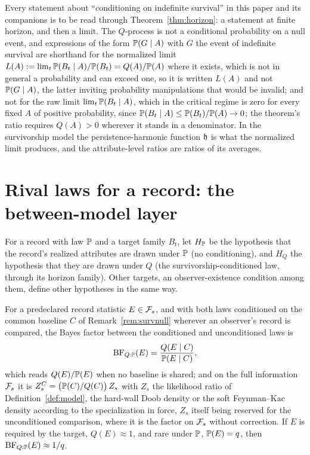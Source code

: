 \begin{remark}\label{rem:limit}
Every statement about ``conditioning on indefinite survival'' in this
paper and its companions is to be read through Theorem~\ref{thm:horizon}:
a statement at finite horizon, and then a limit. The $Q$-process is not a
conditional probability on a null event, and expressions of the form
$\mathbb{P}(G\mid A)$ with $G$ the event of indefinite survival are shorthand for the normalized limit $L(A) := \lim_t \mathbb{P}(B_t \mid A)/\mathbb{P}(B_t) = Q(A)/\mathbb{P}(A)$ where it exists, which is not in general a probability and can exceed one, so it is written $L(A)$ and not $\mathbb{P}(G \mid A)$, the latter inviting probability manipulations that would be invalid; and not for the raw limit $\lim_t \mathbb{P}(B_t \mid A)$, which in the critical regime is zero for every fixed $A$ of positive probability, since $\mathbb{P}(B_t \mid A) \le \mathbb{P}(B_t)/\mathbb{P}(A) \to 0$; the theorem's ratio requires $Q(A) > 0$ wherever it stands in a denominator. In the survivorship model the persistence-harmonic function $\mathfrak{h}$ is what the normalized limit produces, and
the attribute-level ratios are ratios of its averages.
\end{remark}

\section{Rival laws for a record: the between-model layer}
\label{sec:models}

\begin{definition}\label{def:hyps}
For a record with law $\mathbb{P}$ and a target family $B_t$, let $H_{\mathbb{P}}$ be the
hypothesis that the record's realized attributes are drawn under $\mathbb{P}$
(no conditioning), and $H_Q$ the hypothesis that they are drawn under
$Q$ (the survivorship-conditioned law, through its horizon family). Other
targets, an observer-existence condition among them, define other
hypotheses in the same way.
\end{definition}

\begin{proposition}\label{prop:bf}
For a predeclared record statistic $E\in\mathcal{F}_s$, and with both laws
conditioned on the common baseline $C$ of Remark~\ref{rem:survnull}
wherever an observer's record is compared, the Bayes factor between the
conditioned and unconditioned laws is
\begin{equation}\label{eq:bf}
\mathrm{BF}_{Q:\mathbb{P}}(E)=\frac{Q(E\mid C)}{\mathbb{P}(E\mid C)},
\end{equation}
which reads $Q(E)/\mathbb{P}(E)$ when no baseline is shared;
and on the full information $\mathcal{F}_s$ it is $Z^{C}_s = \bigl(\mathbb{P}(C)/Q(C)\bigr)\, Z_s$ with $Z_s$ the likelihood ratio of Definition~\ref{def:model}, the hard-wall Doob density or the soft Feynman--Kac density according to the specialization in force, $Z_s$ itself being reserved for the unconditioned comparison, where it is the factor on $\mathcal{F}_s$ without correction. If $E$ is required by the
target, $Q(E)\approx1$, and rare under $\mathbb{P}$, $\mathbb{P}(E)=q$, then
$\mathrm{BF}_{Q:\mathbb{P}}(E)\approx1/q$.
\end{proposition}

